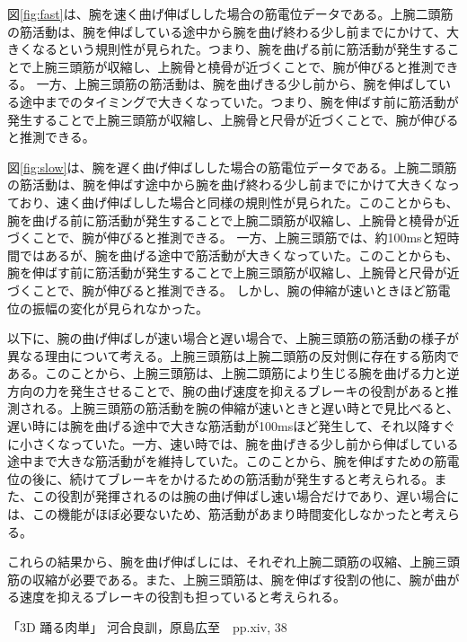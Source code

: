 \documentclass{jsarticle}
\begin{document}
図\ref{fig:fast}は、腕を速く曲げ伸ばしした場合の筋電位データである。上腕二頭筋の筋活動は、腕を伸ばしている途中から腕を曲げ終わる少し前までにかけて、大きくなるという規則性が見られた。つまり、腕を曲げる前に筋活動が発生することで上腕三頭筋が収縮し、上腕骨と橈骨が近づくことで、腕が伸びると推測できる。
一方、上腕三頭筋の筋活動は、腕を曲げきる少し前から、腕を伸ばしている途中までのタイミングで大きくなっていた。つまり、腕を伸ばす前に筋活動が発生することで上腕三頭筋が収縮し、上腕骨と尺骨が近づくことで、腕が伸びると推測できる。

図\ref{fig:slow}は、腕を遅く曲げ伸ばしした場合の筋電位データである。上腕二頭筋の筋活動は、腕を伸ばす途中から腕を曲げ終わる少し前までにかけて大きくなっており、速く曲げ伸ばしした場合と同様の規則性が見られた。このことからも、腕を曲げる前に筋活動が発生することで上腕二頭筋が収縮し、上腕骨と橈骨が近づくことで、腕が伸びると推測できる。
一方、上腕三頭筋では、約100msと短時間ではあるが、腕を曲げる途中で筋活動が大きくなっていた。このことからも、腕を伸ばす前に筋活動が発生することで上腕三頭筋が収縮し、上腕骨と尺骨が近づくことで、腕が伸びると推測できる。
しかし、腕の伸縮が速いときほど筋電位の振幅の変化が見られなかった。

以下に、腕の曲げ伸ばしが速い場合と遅い場合で、上腕三頭筋の筋活動の様子が異なる理由について考える。上腕三頭筋は上腕二頭筋の反対側に存在する筋肉である。このことから、上腕三頭筋は、上腕二頭筋により生じる腕を曲げる力と逆方向の力を発生させることで、腕の曲げ速度を抑えるブレーキの役割があると推測される。上腕三頭筋の筋活動を腕の伸縮が速いときと遅い時とで見比べると、遅い時には腕を曲げる途中で大きな筋活動が100msほど発生して、それ以降すぐに小さくなっていた。一方、速い時では、腕を曲げきる少し前から伸ばしている途中まで大きな筋活動がを維持していた。このことから、腕を伸ばすための筋電位の後に、続けてブレーキをかけるための筋活動が発生すると考えられる。また、この役割が発揮されるのは腕の曲げ伸ばし速い場合だけであり、遅い場合には、この機能がほぼ必要ないため、筋活動があまり時間変化しなかったと考えらる。　

これらの結果から、腕を曲げ伸ばしには、それぞれ上腕二頭筋の収縮、上腕三頭筋の収縮が必要である。また、上腕三頭筋は、腕を伸ばす役割の他に、腕が曲がる速度を抑えるブレーキの役割も担っていると考えられる。


\begin{thebibliography}{9}
	 「3D 踊る肉単」 河合良訓，原島広至　pp.xiv, 38
\end{thebibliography}
\end{document}
